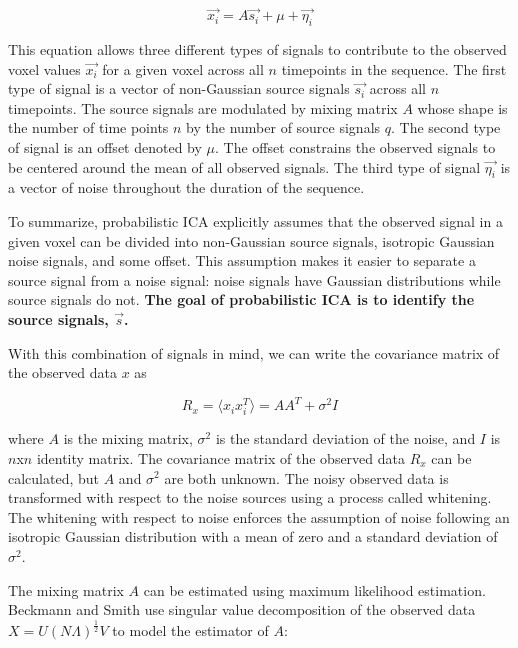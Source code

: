 {\begin{equation}
\label{ch3:eq:ica01}
\vec{x_i} = A \vec{s_i} + \mu + \vec{\eta_i}
\end{equation}

\noindent This equation allows three different types of signals to contribute to the observed voxel values $\vec{x_i}$ for a given voxel across all $n$ timepoints in the sequence. The first type of signal is a vector of non-Gaussian source signals $\vec{s_i}$ across all $n$ timepoints. The source signals are modulated by mixing matrix $A$ whose shape is the number of time points $n$ by the number of source signals $q$. The second type of signal is an offset denoted by $\mu$. The offset constrains the observed signals to be centered around the mean of all observed signals. The third type of signal $\vec{\eta_i}$ is a vector of noise throughout the duration of the sequence.

To summarize, probabilistic ICA explicitly assumes that the observed signal in a given voxel can be divided into non-Gaussian source signals, isotropic Gaussian noise signals, and some offset. This assumption makes it easier to separate a source signal from a noise signal: noise signals have Gaussian distributions while source signals do not. \textbf{The goal of probabilistic ICA is to identify the source signals, $\vec{s}$.}

With this combination of signals in mind, we can write the covariance matrix of the observed data $x$ as

\begin{equation}
\label{ch3:eq:cov-01}
R_x = \langle x_i x_i^T \rangle = AA^T + \sigma ^2 I
\end{equation}

\noindent where $A$ is the mixing matrix, $\sigma^2$ is the standard deviation of the noise, and $I$ is $n$x$n$ identity matrix. The covariance matrix of the observed data $R_x$ can be calculated, but $A$ and $\sigma^2$ are both unknown. The noisy observed data is transformed with respect to the noise sources using a process called whitening. The whitening with respect to noise enforces the assumption of noise following an isotropic Gaussian distribution with a mean of zero and a standard deviation of $\sigma^2$.

The mixing matrix $A$ can be estimated using maximum likelihood estimation. Beckmann and Smith use singular value decomposition of the observed data $X = U(N\Lambda)^{\frac{1}{2}} V$ to model the estimator of $A$:

}
